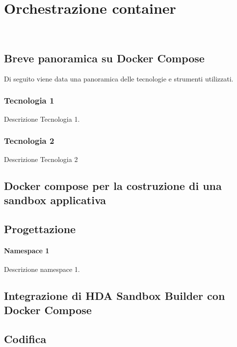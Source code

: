 
\chapter{Orchestrazione container}
\label{cap:orchestrazione-container}

\\

\section{Breve panoramica su Docker Compose}

Di seguito viene data una panoramica delle tecnologie e strumenti utilizzati.

\subsection*{Tecnologia 1}
Descrizione Tecnologia 1.

\subsection*{Tecnologia 2}
Descrizione Tecnologia 2

\section{Docker compose per la costruzione di una sandbox applicativa}
\label{sec:ciclo-vita-software}

\section{Progettazione}
\label{sec:progettazione}

\subsubsection{Namespace 1} %
Descrizione namespace 1.

\begin{namespacedesc}
\end{namespacedesc}


\section{Integrazione di HDA Sandbox Builder con Docker Compose}

\section{Codifica}
